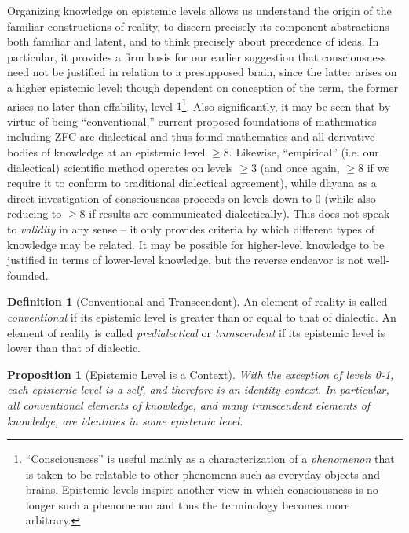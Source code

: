 \documentclass[pra,twocolumn,groupedaddress,10pt]{revtex4}
\newtheorem{proposition}[theorem]{Proposition}
\theoremstyle{definition}
\newtheorem{defn}{Definition}[section]
\begin{document}
Organizing knowledge on epistemic levels allows us understand the origin of the familiar constructions of reality, to discern precisely its component abstractions both familiar and latent, and to think precisely about precedence of ideas. In particular, it provides a firm basis for our earlier suggestion that consciousness need not be justified in relation to a presupposed brain, since the latter arises on a higher epistemic level: though dependent on conception of the term, the former arises no later than effability, level $1$\footnote{``Consciousness'' is useful mainly as a characterization of a \emph{phenomenon} that is taken to be relatable to other phenomena such as everyday objects and brains. Epistemic levels inspire another view in which consciousness is no longer such a phenomenon and thus the terminology becomes more arbitrary.}. Also significantly, it may be seen that by virtue of being ``conventional,'' current proposed foundations of mathematics including ZFC are dialectical and thus found mathematics and all derivative bodies of knowledge at an epistemic level $\geq 8$. Likewise, ``empirical'' (i.e. our dialectical) scientific method operates on levels $\geq 3$ (and once again, $\geq 8$ if we require it to conform to traditional dialectical agreement), while dhyana as a direct investigation of consciousness proceeds on levels down to $0$ (while also reducing to $\geq 8$ if results are communicated dialectically). This does not speak to \emph{validity} in any sense -- it only provides criteria by which different types of knowledge may be related. It may be possible for higher-level knowledge to be justified in terms of lower-level knowledge, but the reverse endeavor is not well-founded.

\begin{defn}[Conventional and Transcendent]
	An element of reality is called \emph{conventional} if its epistemic level is greater than or equal to that of dialectic. An element of reality is called \emph{predialectical} or \emph{transcendent} if its epistemic level is lower than that of dialectic.
\end{defn}

\begin{proposition}[Epistemic Level is a Context]
	With the exception of levels 0-1, each epistemic level is a self, and therefore is an identity context. In particular, all conventional elements of knowledge, and many transcendent elements of knowledge, are identities in some epistemic level.
\end{proposition}
\end{document}
